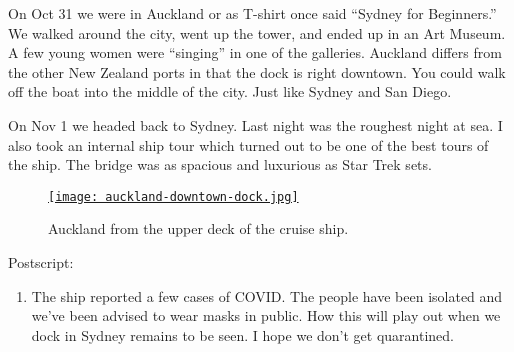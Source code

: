 On Oct 31 we were in Auckland or as T-shirt once said ``Sydney for
Beginners.'' We walked around the city, went up the tower, and ended up
in an Art Museum. A few young women were ``singing'' in one of the
galleries. Auckland differs from the other New Zealand ports in that the
dock is right downtown. You could walk off the boat into the middle of
the city. Just like Sydney and San Diego.

On Nov 1 we headed back to Sydney. Last night was the roughest night at
sea. I also took an internal ship tour which turned out to be one of the
best tours of the ship. The bridge was as spacious and luxurious as Star
Trek sets.


\captionsetup[figure]{labelformat=empty}
\begin{figure}[htbp]
\centering
\href{https://conceptcontrol.smugmug.com/Trips/Overseas/Australia-New-Zealand-2022/i-vX9x9tw/A}{\texttt{[image: auckland-downtown-dock.jpg]}}
\caption{Auckland from the upper deck of the cruise ship.}
\label{fig:7606x4}
\end{figure}

Postscript:

\begin{enumerate}
\def\labelenumi{\arabic{enumi}.}
\item
  The ship reported a few cases of COVID. The people have been isolated
  and we've been advised to wear masks in public. How this will play out
  when we dock in Sydney remains to be seen. I hope we don't get
  quarantined.
\end{enumerate}


%
